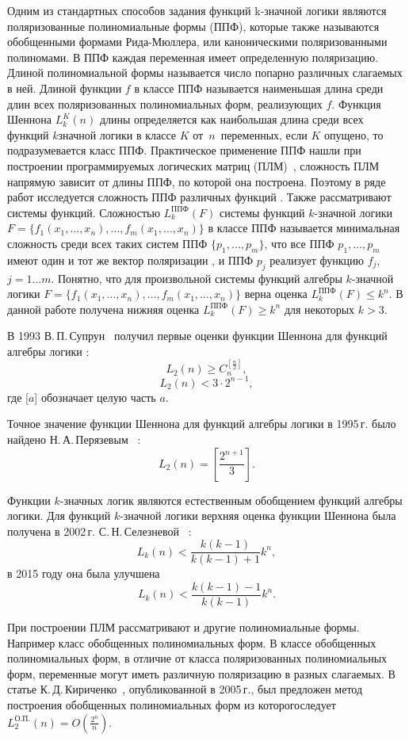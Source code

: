 \documentclass [12pt, a4paper] {article}
\begin{document}
Одним из стандартных способов задания функций k\nobreakdash-значной логики
являются поляризованные полиномиальные формы (ППФ), которые также называются
обобщенными формами Рида-Мюллера, или каноническими поляризованными полиномами.
В ППФ каждая переменная имеет определенную поляризацию.  Длиной полиномиальной
формы называется число попарно различных слагаемых в ней.  Длиной функции $f$ в
классе ППФ называется наименьшая длина среди длин всех поляризованных
полиномиальных форм, реализующих $f$. Функция Шеннона $L^K_k(n)$ длины
определяется как наибольшая длина среди всех функций $k$\nobreakdash значной
логики в классе $K$ от~$n$~переменных, если $K$ опущено, то подразумевается
класс ППФ. Практическое применение ППФ нашли при построении программируемых
логических матриц (ПЛМ)~\cite{ue04, sb90}, сложность ПЛМ напрямую зависит от
длины ППФ, по которой она построена. Поэтому в ряде работ исследуется сложность
ППФ различных функций \cite{sv93,pn95,ss02,kk05,sd08,mn12,sm09}. Также
рассматривают системы функций. Сложностью $L_k^\text{ППФ}(F)$ системы функций
$k$-значной логики $F = \{f_1(x_1, \ldots, x_n), \ldots, f_m(x_1, \ldots,
x_n)\}$ в классе ППФ называется минимальная сложность среди всех таких систем
ППФ $\{p_1, \dots, p_m\}$, что все ППФ $p_1, \dots, p_m$ имеют один и тот же
вектор поляризации , и ППФ $p_j$ реализует функцию $f_j$, $j=1 \dots m$.
Понятно, что для произвольной системы функций алгебры $k$-значной логики $F =
\{f_1(x_1, \ldots, x_n), \ldots, f_m(x_1, \ldots, x_n)\}$ верна оценка
$L_k^\text{ППФ}(F) \leqslant k^n$. В данной работе получена нижняя оценка
$L_k^\text{ППФ}(F) \geqslant k^n$ для некоторых $k > 3$.

В 1993  В.\,П.\,Супрун~\cite{sv93} получил первые оценки функции Шеннона для
функций алгебры логики :
$$
L_2(n) \geqslant C_n^{[\frac{n}{2}]},
$$
$$
L_2(n) < 3 \cdot 2^{n-1},
$$
где [$a$] обозначает целую часть $a$.

Точное значение функции Шеннона для функций алгебры логики в 1995\,г. было
найдено Н.\,А.\,Перязевым~\cite{pn95} :
$$
L_2(n) = \left[\frac{2^{n+1}}{3}\right].
$$

Функции $k$\nobreakdash-значных логик являются естественным обобщением функций
алгебры логики.  Для функций $k$\nobreakdash-значной логики верхняя оценка
функции Шеннона была получена в 2002\,г. С.\,Н.\,Селезневой~\cite{ss02} :
$$
L_k(n) < \frac{k(k-1)}{k(k-1)+1}k^n,
$$
в 2015 году она была улучшена \cite{by15}
$$
L_k(n) < \frac{k(k-1)-1}{k(k-1)}k^n.
$$


При построении ПЛМ рассматривают и другие полиномиальные формы. Например класс
обобщенных полиномиальных форм.  В классе обобщенных полиномиальных форм, в
отличие от класса поляризованных полиномиальных форм, переменные могут иметь
различную поляризацию в разных слагаемых. В статье
К.\,Д.\,Кириченко~\cite{kk05}, опубликованной в 2005\,г., был предложен метод
построения обобщенных полиномиальных форм из которогоследует
$L^{\text{О.П.}}_2(n) = O(\frac{2 ^ n}{n})$.
\end{document}
